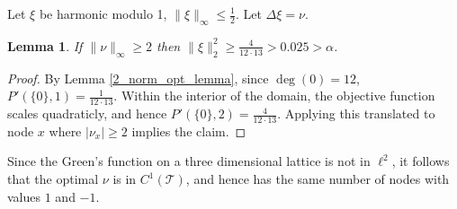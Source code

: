 \documentclass[a4paper, 12pt, notitlepage]{amsart}
\newcommand{\sT}{\mathscr{T}}
\newtheorem{lemma}[theorem]{Lemma}
\theoremstyle{remark}
\begin{document}
 Let $\xi$ be harmonic modulo 1, $\|\xi\|_\infty \leq \frac{1}{2}$. Let $\Delta \xi = \nu$. 
 \begin{lemma}
  If $\|\nu\|_{\infty} \geq 2$ then $\|\xi\|_2^2 \geq \frac{4}{12 \cdot 13} > 0.025 > \alpha$.
 \end{lemma}
\begin{proof}
 By Lemma \ref{2_norm_opt_lemma}, since $\deg(0) = 12$, $P'(\{0\}, 1) = \frac{1}{12 \cdot 13}$.  Within the interior of the domain, the objective function scales quadraticly, and hence $P'(\{0\}, 2) = \frac{4}{12 \cdot 13}$. Applying this translated to node $x$ where $|\nu_x| \geq 2$ implies the claim.
\end{proof}


Since the Green's function on a three dimensional lattice is not in $\ell^2$, it follows that the optimal $\nu$ is in $C^1(\sT)$, and hence has the same number of nodes with values $1$ and $-1$. 
\end{document}

